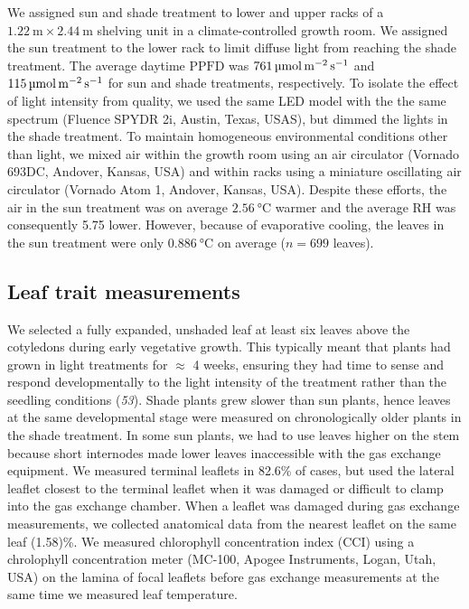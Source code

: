 \documentclass[
  letterpaper,
  DIV=11,
  numbers=noendperiod]{scrartcl}
\newcommand{\ppfd}{$\mathrm{PPFD}$}
\newcommand{\ppfdqty}[1]{$\qty{#1}{\micro\mol\raiseto{-2}\meter\raiseto{-1}\second}$}
\begin{document}
We assigned sun and shade treatment to lower and upper racks of a
\(\qty{1.22}{\meter} \times \qty{2.44}{\meter}\) shelving unit in a
climate-controlled growth room. We assigned the sun treatment to the
lower rack to limit diffuse light from reaching the shade treatment. The
average daytime \ppfd{} was \ppfdqty{761} and \ppfdqty{115} for sun and
shade treatments, respectively. To isolate the effect of light intensity
from quality, we used the same LED model with the the same spectrum
(Fluence SPYDR 2i, Austin, Texas, USAS), but dimmed the lights in the
shade treatment. To maintain homogeneous environmental conditions other
than light, we mixed air within the growth room using an air circulator
(Vornado 693DC, Andover, Kansas, USA) and within racks using a miniature
oscillating air circulator (Vornado Atom 1, Andover, Kansas, USA).
Despite these efforts, the air in the sun treatment was on average
\(\qty{2.56}{\degreeCelsius}\) warmer and the average RH was
consequently 5.75 lower. However, because of evaporative cooling, the
leaves in the sun treatment were only \(\qty{0.886}{\degreeCelsius}\) on
average (\(n = 699\) leaves).

\subsection{Leaf trait measurements}\label{leaf-trait-measurements}

We selected a fully expanded, unshaded leaf at least six leaves above
the cotyledons during early vegetative growth. This typically meant that
plants had grown in light treatments for \(\approx\) 4 weeks, ensuring
they had time to sense and respond developmentally to the light
intensity of the treatment rather than the seedling conditions
(\emph{53}). Shade plants grew slower than sun plants, hence leaves at
the same developmental stage were measured on chronologically older
plants in the shade treatment. In some sun plants, we had to use leaves
higher on the stem because short internodes made lower leaves
inaccessible with the gas exchange equipment. We measured terminal
leaflets in 82.6\% of cases, but used the lateral leaflet closest to the
terminal leaflet when it was damaged or difficult to clamp into the gas
exchange chamber. When a leaflet was damaged during gas exchange
measurements, we collected anatomical data from the nearest leaflet on
the same leaf (1.58)\%. We measured chlorophyll concentration index
(CCI) using a chrolophyll concentration meter (MC-100, Apogee
Instruments, Logan, Utah, USA) on the lamina of focal leaflets before
gas exchange measurements at the same time we measured leaf temperature.
\end{document}
